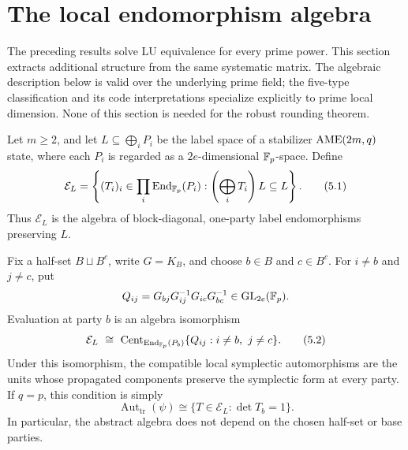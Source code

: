 \section{The local endomorphism algebra}
\label{sec:endomorphism-algebra}

The preceding results solve LU equivalence for every prime power.  This
section extracts additional structure from the same systematic matrix.  The
algebraic description below is valid over the underlying prime field; the
five-type classification and its code interpretations specialize explicitly
to prime local dimension.  None of this section is needed for the robust
rounding theorem.

Let \(m\geq2\), and let \(L\subseteq\bigoplus_iP_i\) be the label space of
a stabilizer \(\mathrm{AME}(2m,q)\) state, where each \(P_i\) is regarded as a
\(2e\)-dimensional \(\mathbb F_p\)-space.  Define
\[
 \mathcal E_L=
 \left\{(T_i)_i\in\prod_i\operatorname{End}_{\mathbb F_p}(P_i):
   \left(\bigoplus_iT_i\right)L\subseteq L\right\}.       \tag{5.1}
\]
Thus \(\mathcal E_L\) is the algebra of block-diagonal, one-party label
endomorphisms preserving \(L\).

\begin{theorem}
\label{thm:local-endomorphism-algebra}
Fix a half-set \(B\sqcup B^c\), write \(G=K_B\), and choose
\(b\in B\) and \(c\in B^c\).  For \(i\ne b\) and \(j\ne c\), put
\[
 Q_{ij}=G_{bj}G_{ij}^{-1}G_{ic}G_{bc}^{-1}
   \in\operatorname{GL}_{2e}(\mathbb F_p).
\]
Evaluation at party \(b\) is an algebra isomorphism
\[
 \mathcal E_L\ \cong\
 \operatorname{Cent}_{\operatorname{End}_{\F_p}(P_b)}
       \{Q_{ij}:i\ne b,\ j\ne c\}.                    \tag{5.2}
\]
Under this isomorphism, the compatible local symplectic automorphisms are
the units whose propagated components preserve the symplectic form at every
party.  If \(q=p\), this condition is simply
\[
 \operatorname{Aut}_{\mathrm{tr}}(\psi)
 \cong\{T\in\mathcal E_L:\det T_b=1\}.               \tag{5.3}
\]
In particular, the abstract algebra does not depend on the chosen half-set
or base parties.
\end{theorem}

